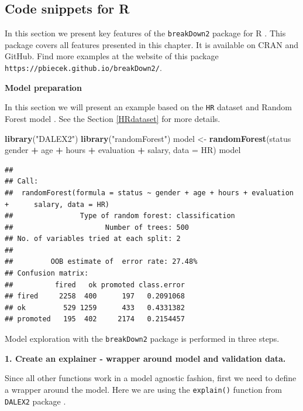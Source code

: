\documentclass[]{krantz}
\newenvironment{Shaded}{\begin{snugshade}}{\end{snugshade}}
\newcommand{\DataTypeTok}[1]{\textcolor[rgb]{0.13,0.29,0.53}{#1}}
\newcommand{\KeywordTok}[1]{\textcolor[rgb]{0.13,0.29,0.53}{\textbf{#1}}}
\newcommand{\NormalTok}[1]{#1}
\newcommand{\OperatorTok}[1]{\textcolor[rgb]{0.81,0.36,0.00}{\textbf{#1}}}
\newcommand{\StringTok}[1]{\textcolor[rgb]{0.31,0.60,0.02}{#1}}
\theoremstyle{definition}
\theoremstyle{definition}
\theoremstyle{definition}
\theoremstyle{remark}
\begin{document}
\hypertarget{code-snippets-for-r}{%
\subsection{Code snippets for R}\label{code-snippets-for-r}}

In this section we present key features of the \texttt{breakDown2}
package for R \citep{R-breakDown}. This package covers all features
presented in this chapter. It is available on CRAN and GitHub. Find more
examples at the website of this package
\texttt{https://pbiecek.github.io/breakDown2/}.

\textbf{Model preparation}

In this section we will present an example based on the \texttt{HR}
dataset and Random Forest model \citep{R-randomForest}. See the Section
\ref{HRdataset} for more details.

\begin{Shaded}
\begin{Highlighting}[]
\KeywordTok{library}\NormalTok{(}\StringTok{"DALEX2"}\NormalTok{)}
\KeywordTok{library}\NormalTok{(}\StringTok{"randomForest"}\NormalTok{)}
\NormalTok{model <-}\StringTok{ }\KeywordTok{randomForest}\NormalTok{(status }\OperatorTok{~}\StringTok{ }\NormalTok{gender }\OperatorTok{+}\StringTok{ }\NormalTok{age }\OperatorTok{+}\StringTok{ }\NormalTok{hours }\OperatorTok{+}\StringTok{ }\NormalTok{evaluation }\OperatorTok{+}\StringTok{ }\NormalTok{salary, }\DataTypeTok{data =}\NormalTok{ HR)}
\NormalTok{model}
\end{Highlighting}
\end{Shaded}

\begin{verbatim}
## 
## Call:
##  randomForest(formula = status ~ gender + age + hours + evaluation +      salary, data = HR) 
##                Type of random forest: classification
##                      Number of trees: 500
## No. of variables tried at each split: 2
## 
##         OOB estimate of  error rate: 27.48%
## Confusion matrix:
##          fired   ok promoted class.error
## fired     2258  400      197   0.2091068
## ok         529 1259      433   0.4331382
## promoted   195  402     2174   0.2154457
\end{verbatim}

Model exploration with the \texttt{breakDown2} package is performed in
three steps.

\textbf{1. Create an explainer - wrapper around model and validation
data.}

Since all other functions work in a model agnostic fashion, first we
need to define a wrapper around the model. Here we are using the
\texttt{explain()} function from \texttt{DALEX2} package
\citep{R-DALEX}.
\end{document}

